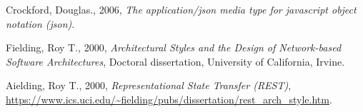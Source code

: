\begin{thebibliography}{99}

	Crockford, Douglas., 2006, \textit{The application/json media type for javascript object notation (json)}.

	Fielding, Roy T., 2000, \textit{Architectural Styles and the Design of Network-based Software Architectures}, Doctoral dissertation, University of California, Irvine.

	Aielding, Roy T., 2000, \textit{Representational State Transfer (REST)}, \url{https://www.ics.uci.edu/~fielding/pubs/dissertation/rest_arch_style.htm}.

\end{thebibliography}